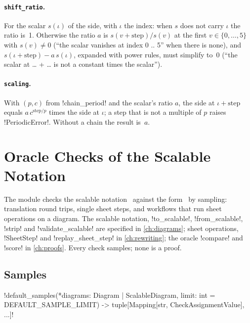 \paragraph{\texttt{shift\_ratio}.} For the scalar $s(\iota)$ of the side, with $\iota$ the index: when $s$ does not carry $\iota$ the ratio is~1. Otherwise the ratio $a$ is $s(v+\text{step})/s(v)$ at the first $v\in\{0,\dots,5\}$ with $s(v)\ne0$ (``the scalar vanishes at index 0 .. 5'' when there is none), and $s(\iota+\text{step})-a\,s(\iota)$, expanded with power rules, must simplify to~0 (``the scalar at \ldots{} + \ldots{} is not a constant times the scalar'').

\paragraph{\texttt{scaling}.} With $(p,c)$ from \py!chain_period! and the scalar's ratio $a$, the side at $\iota+\text{step}$ equals $a\,c^{\text{step}/p}$ times the side at $\iota$; a step that is not a multiple of $p$ raises \py!PeriodicError!. Without a chain the result is~$a$.

\section{Oracle Checks of the Scalable Notation}\label{sec:semantics-interop}

The module  checks the scalable notation~\cite{carette2019szx,carette2022bangboxes} against the \bbox{} form~\cite{dixon2009graphical,kissinger2014pattern} by sampling: translation round trips, single sheet steps, and workflows that run sheet operations on a \bbox{} diagram. The scalable notation, \py!to_scalable!, \py!from_scalable!, \py!strip! and \py!validate_scalable! are specified in \cref{ch:diagrams}; sheet operations, \py!SheetStep! and \py!replay_sheet_step! in \cref{ch:rewriting}; the oracle \py!compare! and \py!score! in \cref{ch:proofs}. Every check samples; none is a proof.

\subsection{Samples}

\begin{signature}
\py!default_samples(*diagrams: Diagram | ScalableDiagram, limit: int = DEFAULT_SAMPLE_LIMIT) -> tuple[Mapping[str, CheckAssignmentValue], ...]!
\end{signature}

